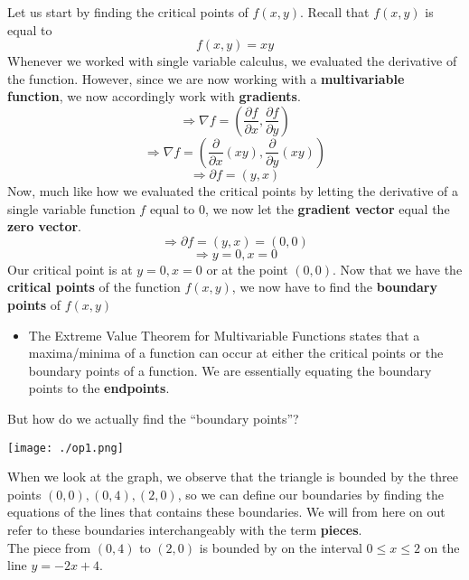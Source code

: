 \documentclass{report}
\begin{document}
\begin{sloppypar}
\begin{itemize}
\end{itemize}
Let us start by finding the critical points of
$f(x,y)$.
Recall that $f(x,y)$ is equal to
\begin{equation} \label{eq2}
f(x,y) = xy
\end{equation}
Whenever we worked with single variable calculus,
we evaluated the derivative of the function.
However, since we are now working with a
\textbf{multivariable function}, we now accordingly
work with \textbf{gradients}.
\[ \Rightarrow \nabla f = (\frac{\partial f}{\partial x}, \frac{\partial f}{\partial y} )\]
\[ \Rightarrow \nabla f = (\frac{\partial}{\partial x} (xy),
  \frac{\partial}{\partial y} (xy) ) \]
\[ \Rightarrow \partial f = \left( y, x \right)\]
Now, much like how we evaluated the critical points
by letting the derivative of a single variable function
$ f $ equal to 0, we now let the \textbf{gradient vector} equal the \textbf{zero vector}.
\[ \Rightarrow \partial f = \left( y,x \right) = (0,0) \]
\[ \Rightarrow y = 0, x = 0 \]
Our critical point is at $ y = 0, x = 0$ or at the
point $ (0,0) $.
Now that we have the \textbf{critical points} of
the function $ f(x,y)$, we now have to find
the \textbf{boundary points} of $ f(x,y)$
\begin{itemize}
  \item The Extreme Value Theorem for Multivariable
        Functions states that a maxima/minima
        of a function can occur at either
        the critical points or the boundary points
        of a function. We are essentially equating
        the boundary points to the \textbf{endpoints}.
\end{itemize}
But how do we actually find the ``boundary points''?
\begin{center}
  \texttt{[image: ./op1.png]}
\end{center}

When we look at the graph, we observe that the
triangle is bounded by the three points $ (0,0), (0,4),
(2,0)$, so we can define our boundaries by finding
the equations of the lines that contains these boundaries. We will from here on out
refer to these boundaries interchangeably with
the term \textbf{pieces}. \\

The piece from $ (0,4)$ to $(2,0)$ is
bounded by on the interval $ 0 \le x \le 2$
on the line $ y = -2x + 4 $. \\


\end{sloppypar}
\end{document}
